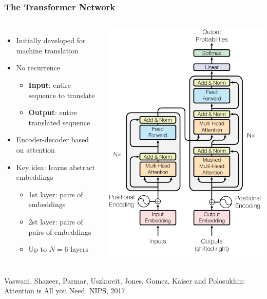 \documentclass[10pt]{beamer}
\begin{document}
\begin{frame}
  \frametitle{The Transformer Network}
  \begin{columns}
\begin{itemize}
\setlength\itemsep{.8em}
\item Initially developed for machine translation
\item No recurrence
\begin{itemize}
\item \textbf{Input}: entire sequence to translate
\item \textbf{Output}: entire translated sequence
\end{itemize}
\item Encoder-decoder based on attention 
\item Key idea: learns abstract embeddings
\begin{itemize}
\item 1st layer: pairs of embeddings
\item 2st layer: pairs of pairs of embeddings
\item Up to $N=6$ layers
\end{itemize}
\end{itemize}
\begin{center}
	\includegraphics[width=.9\columnwidth]{images/transf}
\end{center}
    \end{columns}
\vspace{1cm}
\scriptsize{Vaswani, Shazeer, Parmar, Uszkoreit, Jones, Gomez, Kaiser and Polosukhin: Attention is All you Need. NIPS, 2017.}
\end{frame}
\end{document}
